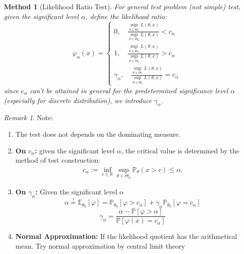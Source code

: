 \documentclass[a4paper,12pt, oneside, fleqn]{book}
\newtheorem{method}[theorem]{Method}
\theoremstyle{definition}
\theoremstyle{remark}
\newtheorem*{remark}{Remark}
\begin{document}
\begin{method}[Likelihood Ratio Test]\label{Test}
For general test problem (not simple) test, given the significant level $\alpha$, define the likelihood ratio: 
\begin{equation}
    \varphi_\alpha(x) = 
    \left\{\begin{aligned}
        0,  \quad   \frac{\sup_{\theta \in \Theta_1}L(\theta, x)}{\sup_{\theta \in \Theta_0} L(\theta, x)} < c_{\alpha}\\
        1,  \quad \frac{\sup_{\theta \in \Theta_1}L(\theta, x)}{\sup_{\theta \in \Theta_0} L(\theta, x)} > c_{\alpha}\\
        \gamma_{\alpha}, \quad \frac{\sup_{\theta \in \Theta_1}L(\theta, x)}{\sup_{\theta \in \Theta_0} L(\theta, x)} = c_{\alpha} 
    \end{aligned}\right.
\end{equation}
since $c_\alpha$ can't be attained in general for the predetermined significance level $\alpha$(especially for discrete distribution), we introduce $\gamma_\alpha$. 
\end{method}
\begin{remark}
Note:
\begin{enumerate}
    \item The test does not depends on the dominating measure.
    \item \textbf{On $c_\alpha$:} given the significant level $\alpha$, the critical value is determined by the method of test construction:
    \begin{align*}
    	c_\alpha:= \inf_{c \in \mathbb{R}} \sup_{\theta \in \Theta_0} \mathbb{P}_\theta ( x > c) \le \alpha. 
    \end{align*} 
    \item \textbf{On  $\gamma_\alpha$:} Given the significant level $\alpha$
    \begin{equation*}
        \alpha \overset{!}{=} \mathbb{E}_{\theta_{0}}[\varphi] = \mathbb{P}_{\theta_{0}}[\varphi > c_{\alpha}] + \gamma_\alpha \mathbb{P}_{\theta_{0}}[\varphi = c_\alpha]
    \end{equation*}
    \begin{equation*}
        \gamma_\alpha = \frac{\alpha - \mathbb{P}[\varphi > \alpha]}{\mathbb{P}[\varphi(x) = c_{\alpha}]}
    \end{equation*}
    \item \textbf{Normal Approximation:} If the likelihood quotient has the arithmetical mean. Try normal approximation by central limit theory
\end{enumerate}
\end{remark}
\end{document}

